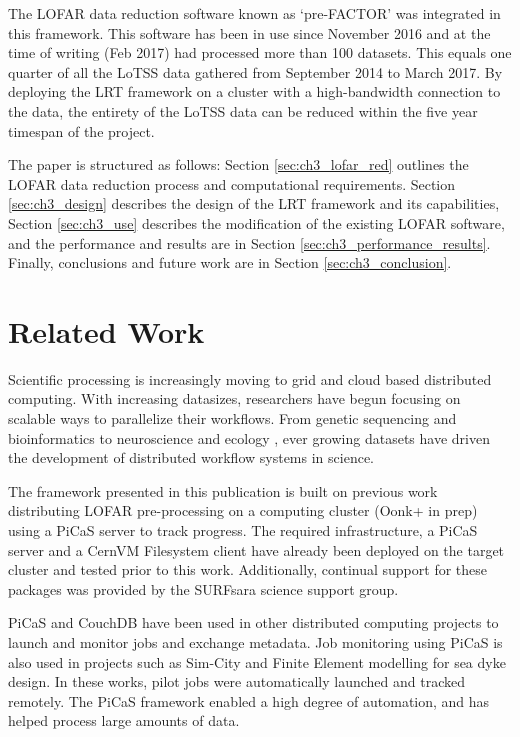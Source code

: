 The LOFAR data reduction software known as `pre-FACTOR'\cite{prefactor} was integrated in this framework. This software has been in use since November 2016 and at the time of writing (Feb 2017) had processed more than 100 datasets. This equals one quarter of all the LoTSS data gathered from September 2014 to March 2017. By deploying the LRT framework on a cluster with a high-bandwidth connection to the data, the entirety of the LoTSS data can be reduced within the five year timespan of the project. 

The paper is structured as follows: Section \ref{sec:ch3_lofar_red} outlines the LOFAR data reduction process and computational requirements. Section \ref{sec:ch3_design} describes the design of the LRT framework and its capabilities, Section \ref{sec:ch3_use} describes the modification of the existing LOFAR software, and the performance and results are in Section \ref{sec:ch3_performance_results}. Finally, conclusions  and future work are in Section \ref{sec:ch3_conclusion}.

\section{Related Work}

Scientific processing is increasingly moving to grid and cloud based distributed computing. With increasing datasizes, researchers have begun focusing on scalable ways to parallelize their workflows. From genetic sequencing \cite{scalable} and bioinformatics\cite{bioinfo} to neuroscience\cite{neurogrid} and ecology \cite{ecoinfo}, ever growing datasets have driven the development of distributed workflow systems in science\cite{pegasus}\cite{swift}. 

The framework presented in this publication is built on previous work distributing LOFAR pre-processing on a computing cluster (Oonk+ in prep) using a PiCaS server to track progress\cite{picas}. The required infrastructure, a PiCaS\cite{picas} server and a CernVM Filesystem client\cite{cvmfs2008} have already been deployed on the target cluster and tested prior to this work. Additionally, continual support for these packages was provided by the SURFsara science support group. 

PiCaS\cite{picas_git} and CouchDB\cite{couchdb} have been used in other distributed computing projects to launch and monitor jobs and exchange metadata. Job monitoring using PiCaS is also used in projects such as Sim-City\cite{simcity} and Finite Element modelling for sea dyke design\cite{li2017reliability}. In these works, pilot jobs were automatically launched and tracked remotely. The PiCaS framework enabled a high degree of automation, and has helped process large amounts of data.  

